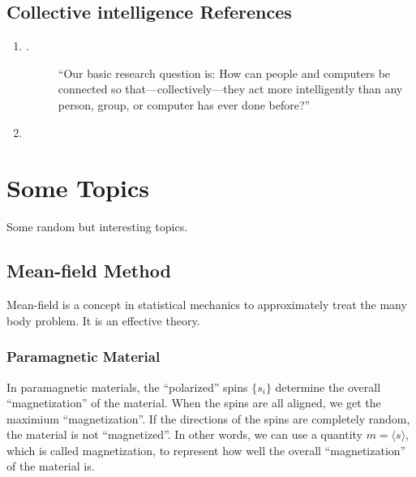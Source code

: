 \documentclass[letterpaper,10pt,english]{sphinxmanual}
\begin{document}
\section{Collective intelligence References}
\label{\detokenize{collective/refs::doc}}\label{\detokenize{collective/refs:collective-intelligence-references}}\begin{enumerate}
\item {} \begin{description}
\item[{.}] \leavevmode
“Our basic research question is: How can people and computers be connected so that—collectively—they act more intelligently than any person, group, or computer has ever done before?”

\end{description}

\item {} 

\end{enumerate}


\chapter{Some Topics}
\label{\detokenize{topics/index::doc}}\label{\detokenize{topics/index:some-topics}}
Some random but interesting topics.


\section{Mean-field Method}
\label{\detokenize{topics/mean-field::doc}}\label{\detokenize{topics/mean-field:mean-field-method}}
Mean-field is a concept in statistical mechanics to approximately treat the many body problem. It is an effective theory.


\subsection{Paramagnetic Material}
\label{\detokenize{topics/mean-field:paramagnetic-material}}
In paramagnetic materials, the “polarized” spins \(\{s_i\}\) determine the overall “magnetization” of the material. When the spins are all aligned, we get the maximium “magnetization”. If the directions of the spins are completely random, the material is not “magnetized”. In other words, we can use a quantity \(m=\langle s \rangle\), which is called magnetization, to represent how well the overall “magnetization” of the material is.
\end{document}
